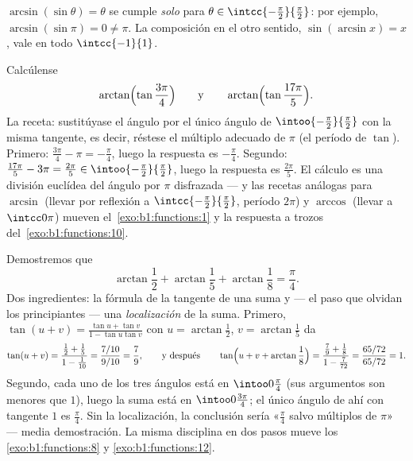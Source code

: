 \begin{remark}
$\arcsin(\sin\theta) = \theta$ se cumple \emph{solo} para $\theta \in
\intcc{-\frac\pi2}{\frac\pi2}$: por ejemplo,
$\arcsin(\sin\pi) = 0 \neq \pi$. La composición en el otro sentido,
$\sin(\arcsin x) = x$, vale en todo $\intcc{-1}{1}$.
\end{remark}

\begin{example}
\label{ex:b1:functions:wrap}
Calcúlense
\[
\arctan\Bigl(\tan\frac{3\pi}4\Bigr)
\qquad\text{y}\qquad
\arctan\Bigl(\tan\frac{17\pi}5\Bigr).
\]
La receta: sustitúyase el ángulo por el único ángulo de
$\intoo{-\frac\pi2}{\frac\pi2}$ con la misma tangente, es decir,
réstese el múltiplo adecuado de $\pi$ (el período de $\tan$). Primero:
$\frac{3\pi}4 - \pi = -\frac\pi4$, luego la respuesta es $-\frac\pi4$.
Segundo: $\frac{17\pi}5 - 3\pi = \frac{2\pi}5 \in
\intoo{-\frac\pi2}{\frac\pi2}$, luego la respuesta es $\frac{2\pi}5$.
El cálculo es una división euclídea del ángulo por $\pi$ disfrazada
--- y las recetas análogas para $\arcsin$ (llevar por reflexión a
$\intcc{-\frac\pi2}{\frac\pi2}$, período $2\pi$) y $\arccos$ (llevar a
$\intcc0\pi$) mueven el~\cref{exo:b1:functions:1} y la respuesta a
trozos del~\cref{exo:b1:functions:10}.
\end{example}

\begin{example}\label{ex:b1:functions:arctansum}
Demostremos que
\[
\arctan\frac12 + \arctan\frac15 + \arctan\frac18 = \frac\pi4 .
\]
Dos ingredientes: la fórmula de la tangente de una suma y --- el paso
que olvidan los principiantes --- una \emph{localización} de la suma.
Primero, $\tan(u + v) = \frac{\tan u + \tan v}{1 - \tan u\tan v}$ con
$u = \arctan\frac12$, $v = \arctan\frac15$ da
\[
\tan(u + v) = \frac{\frac12 + \frac15}{1 - \frac1{10}}
= \frac{7/10}{9/10} = \frac79,
\qquad\text{y después}\qquad
\tan\Bigl(u + v + \arctan\frac18\Bigr)
= \frac{\frac79 + \frac18}{1 - \frac7{72}}
= \frac{65/72}{65/72} = 1 .
\]
Segundo, cada uno de los tres ángulos está en $\intoo0{\frac\pi4}$
(sus argumentos son menores que $1$), luego la suma está en
$\intoo0{\frac{3\pi}4}$; el único ángulo de ahí con tangente $1$ es
$\frac\pi4$. Sin la localización, la conclusión sería «$\frac\pi4$
salvo múltiplos de $\pi$» --- media demostración. La misma disciplina
en dos pasos mueve los \cref{exo:b1:functions:8}
y \cref{exo:b1:functions:12}.
\end{example}

